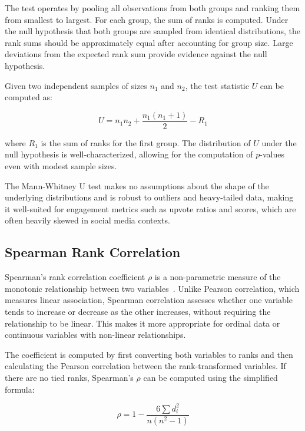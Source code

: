 The test operates by pooling all observations from both groups and ranking them from smallest to largest. For each group, the sum of ranks is computed. Under the null hypothesis that both groups are sampled from identical distributions, the rank sums should be approximately equal after accounting for group size. Large deviations from the expected rank sum provide evidence against the null hypothesis.

Given two independent samples of sizes $n_1$ and $n_2$, the test statistic $U$ can be computed as:

\begin{equation}
U = n_1 n_2 + \frac{n_1(n_1 + 1)}{2} - R_1
\end{equation}

where $R_1$ is the sum of ranks for the first group. The distribution of $U$ under the null hypothesis is well-characterized, allowing for the computation of $p$-values even with modest sample sizes.

The Mann-Whitney U test makes no assumptions about the shape of the underlying distributions and is robust to outliers and heavy-tailed data, making it well-suited for engagement metrics such as upvote ratios and scores, which are often heavily skewed in social media contexts.

\subsection{Spearman Rank Correlation}
\label{subsec:spearman}

Spearman's rank correlation coefficient $\rho$ is a non-parametric measure of the monotonic relationship between two variables~\cite{spearman1904proof}. Unlike Pearson correlation, which measures linear association, Spearman correlation assesses whether one variable tends to increase or decrease as the other increases, without requiring the relationship to be linear. This makes it more appropriate for ordinal data or continuous variables with non-linear relationships.

The coefficient is computed by first converting both variables to ranks and then calculating the Pearson correlation between the rank-transformed variables. If there are no tied ranks, Spearman's $\rho$ can be computed using the simplified formula:

\begin{equation}
\rho = 1 - \frac{6 \sum d_i^2}{n(n^2 - 1)}
\end{equation}


